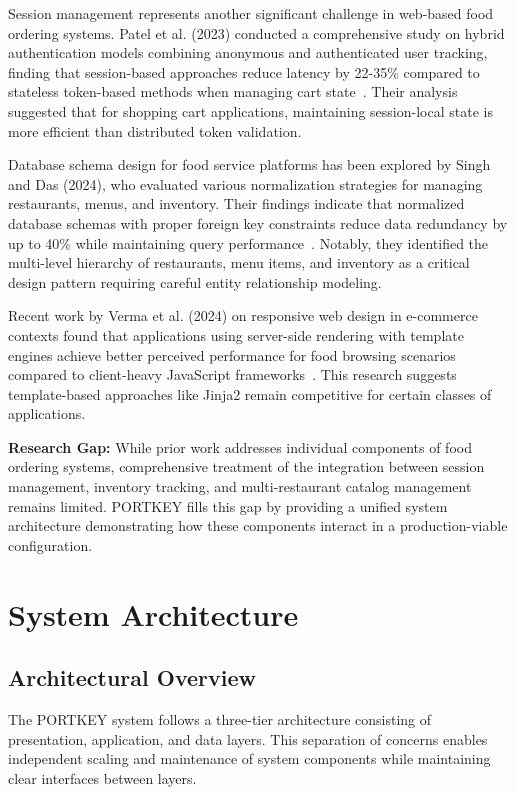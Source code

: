 \documentclass{ieeeaccess}
\begin{document}
Session management represents another significant challenge in web-based food ordering systems. Patel et al. (2023) conducted a comprehensive study on hybrid authentication models combining anonymous and authenticated user tracking, finding that session-based approaches reduce latency by 22-35\% compared to stateless token-based methods when managing cart state~\cite{b4}. Their analysis suggested that for shopping cart applications, maintaining session-local state is more efficient than distributed token validation.

Database schema design for food service platforms has been explored by Singh and Das (2024), who evaluated various normalization strategies for managing restaurants, menus, and inventory. Their findings indicate that normalized database schemas with proper foreign key constraints reduce data redundancy by up to 40\% while maintaining query performance~\cite{b5}. Notably, they identified the multi-level hierarchy of restaurants, menu items, and inventory as a critical design pattern requiring careful entity relationship modeling.

Recent work by Verma et al. (2024) on responsive web design in e-commerce contexts found that applications using server-side rendering with template engines achieve better perceived performance for food browsing scenarios compared to client-heavy JavaScript frameworks~\cite{b6}. This research suggests template-based approaches like Jinja2 remain competitive for certain classes of applications.

\textbf{Research Gap:} While prior work addresses individual components of food ordering systems, comprehensive treatment of the integration between session management, inventory tracking, and multi-restaurant catalog management remains limited. PORTKEY fills this gap by providing a unified system architecture demonstrating how these components interact in a production-viable configuration.

\section{System Architecture}
\label{sec:arch}

\subsection{Architectural Overview}
The PORTKEY system follows a three-tier architecture consisting of presentation, application, and data layers. This separation of concerns enables independent scaling and maintenance of system components while maintaining clear interfaces between layers.
\end{document}
